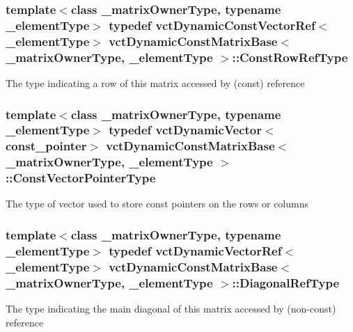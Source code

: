 \subsubsection[{Const\+Row\+Ref\+Type}]{\setlength{\rightskip}{0pt plus 5cm}template$<$class \+\_\+matrix\+Owner\+Type, typename \+\_\+element\+Type$>$ typedef {\bf vct\+Dynamic\+Const\+Vector\+Ref}$<$\+\_\+element\+Type$>$ {\bf vct\+Dynamic\+Const\+Matrix\+Base}$<$ \+\_\+matrix\+Owner\+Type, \+\_\+element\+Type $>$\+::{\bf Const\+Row\+Ref\+Type}}\label{classvct_dynamic_const_matrix_base_a42a300cb1afd5f0602ba5c2d7d9cc40b}
The type indicating a row of this matrix accessed by (const) reference \hypertarget{classvct_dynamic_const_matrix_base_ae4eb1369d9d05fdf98786c5583834e73}{}
\subsubsection[{Const\+Vector\+Pointer\+Type}]{\setlength{\rightskip}{0pt plus 5cm}template$<$class \+\_\+matrix\+Owner\+Type, typename \+\_\+element\+Type$>$ typedef {\bf vct\+Dynamic\+Vector}$<$const\+\_\+pointer$>$ {\bf vct\+Dynamic\+Const\+Matrix\+Base}$<$ \+\_\+matrix\+Owner\+Type, \+\_\+element\+Type $>$\+::{\bf Const\+Vector\+Pointer\+Type}}\label{classvct_dynamic_const_matrix_base_ae4eb1369d9d05fdf98786c5583834e73}
The type of vector used to store const pointers on the rows or columns \hypertarget{classvct_dynamic_const_matrix_base_a2773e894d2ce8aa7a479eeecc535ac33}{}
\subsubsection[{Diagonal\+Ref\+Type}]{\setlength{\rightskip}{0pt plus 5cm}template$<$class \+\_\+matrix\+Owner\+Type, typename \+\_\+element\+Type$>$ typedef {\bf vct\+Dynamic\+Vector\+Ref}$<$\+\_\+element\+Type$>$ {\bf vct\+Dynamic\+Const\+Matrix\+Base}$<$ \+\_\+matrix\+Owner\+Type, \+\_\+element\+Type $>$\+::{\bf Diagonal\+Ref\+Type}}\label{classvct_dynamic_const_matrix_base_a2773e894d2ce8aa7a479eeecc535ac33}
The type indicating the main diagonal of this matrix accessed by (non-\/const) reference \hypertarget{classvct_dynamic_const_matrix_base_aee4b4524b7972fd1b324cba62505a949}{}
